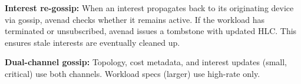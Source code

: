 \textbf{Interest re-gossip:} When an interest propagates back to its originating device via gossip, avenad checks whether it remains active. If the workload has terminated or unsubscribed, avenad issues a tombstone with updated HLC. This ensures stale interests are eventually cleaned up.

\textbf{Dual-channel gossip:} Topology, cost metadata, and interest updates (small, critical) use both channels. Workload specs (larger) use high-rate only.

